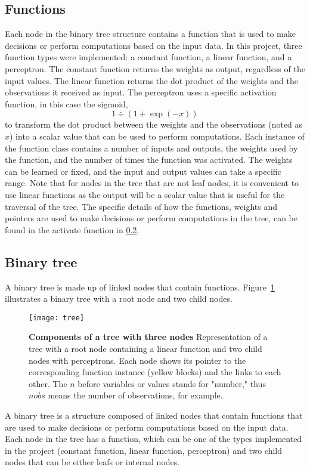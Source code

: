 \subsection{Functions}
Each node in the binary tree structure contains a function that is used to make decisions or perform computations based on the input data. In this project, three function types were implemented: a constant function, a linear function, and a perceptron.
The constant function returns the weights as output, regardless of the input values. The linear function returns the dot product of the weights and the observations it received as input. The perceptron uses a specific activation function, in this case the sigmoid,
\begin{equation}
1 \div(1 + \exp(-x))
\end{equation}
to transform the dot product between the weights and the observations (noted as $x$) into a scalar value that can be used to perform computations. Each instance of the function class contains a number of inputs and outputs, the weights used by the function, and the number of times the function was activated. The weights can be learned or fixed, and the input and output values can take a specific range.
Note that for nodes in the tree that are not leaf nodes, it is convenient to use linear functions as the output will be a scalar value that is useful for the traversal of the tree. The specific details of how the functions, weights and pointers are used to make decisions or perform computations in the tree, can be found in the activate function in \ref{binary_tree}. 

\subsection{Binary tree}
\label{binary_tree}
A binary tree is made up of linked nodes that contain functions. Figure~\ref{fig:tree_composition} illustrates a binary tree with a root node and two child nodes.
\begin{figure}[!ht]
\centering
\texttt{[image: tree]}
\caption[Components of a tree with three nodes]{
  \textbf{Components of a tree with three nodes}
Representation of a tree with a root node containing a linear function and two child nodes with perceptrons. Each node shows its pointer to the corresponding function instance (yellow blocks) and the links to each other. The $n$ before variables or values stands for "number," thus $nobs$ means the number of observations, for example.
 }
\label{fig:tree_composition}
\end{figure}
A binary tree is a structure composed of linked nodes that contain functions that are used to make decisions or perform computations based on the input data. Each node in the tree has a function, which can be one of the types implemented in the project (constant function, linear function, perceptron) and two child nodes that can be either leafs or internal nodes.


